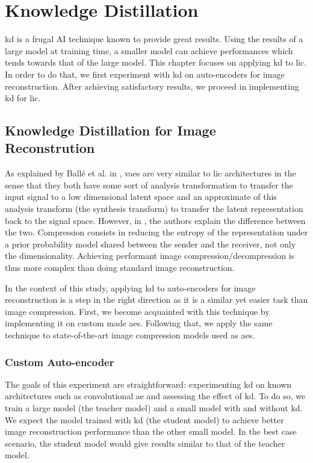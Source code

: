 \chapter{Knowledge Distillation}
\label{part_2}
\acrfull{kd} is a frugal AI technique known to provide great results. Using the results of a large model at training time, a smaller model can achieve performances which tends towards that of the large model. This chapter focuses on applying \acrshort{kd} to \acrshort{lic}. In order to do that, we first experiment with \acrshort{kd} on auto-encoders for image reconstruction. After achieving satisfactory results, we proceed in implementing \acrshort{kd} for \acrshort{lic}.

\section{Knowledge Distillation for Image Reconstrution}
As explained by Ballé et al. in \cite{ballé2018variationalimagecompressionscale}, \acrshort{vae}s are very similar to \acrshort{lic} architectures in the sense that they both have some sort of analysis transformation to transfer the input signal to a low dimensional latent space and an approximate of this analysis transform (the synthesis transform) to transfer the latent representation back to the signal space. However, in \cite{minnen2018jointautoregressivehierarchicalpriors}, the authors explain the difference between the two. Compression consists in reducing the entropy of the representation under a prior probability model shared between the sender and the receiver, not only the dimensionality. Achieving performant image compression/decompression is thus more complex than doing standard image reconstruction.

In the context of this study, applying \acrshort{kd} to auto-encoders for image reconstruction is a step in the right direction as it is a similar yet easier task than image compression. First, we become acquainted with this technique by implementing it on custom made \acrshort{ae}s. Following that, we apply the same technique to state-of-the-art image compression models used as \acrshort{ae}s.

\subsection{Custom Auto-encoder}
The goals of this experiment are straightforward: experimenting \acrshort{kd} on known architectures such as convolutional \acrshort{ae} and assessing the effect of \acrshort{kd}. To do so, we train a large model (the teacher model) and a small model with and without \acrshort{kd}. We expect the model trained with \acrshort{kd} (the student model) to achieve better image reconstruction performance than the other small model. In the best case scenario, the student model would give results similar to that of the teacher model.

